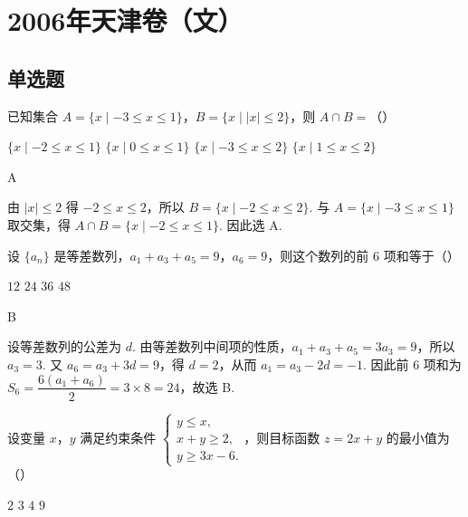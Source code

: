 \chapter{2006年天津卷（文）}
\section{单选题}
\begin{problem}
已知集合 \(A = \{x \mid -3 \leqslant x \leqslant 1\}\)，\(B = \{x \mid |x| \leqslant 2\}\)，则 \(A \cap B =\)（\quad）

\choices
    {\(\{x\mid -2\leqslant x\leqslant 1\}\)}
    {\(\{x\mid 0\leqslant x\leqslant 1\}\)}
    {\(\{x\mid -3\leqslant x\leqslant 2\}\)}
    {\(\{x\mid 1\leqslant x\leqslant 2\}\)}
\end{problem}

\begin{answer}
A
\end{answer}

\begin{solution}
由 \(\lvert x\rvert\leqslant2\) 得 \(-2\leqslant x\leqslant2\)，所以 \(B=\{x\mid -2\leqslant x\leqslant2\}\). 与 \(A=\{x\mid -3\leqslant x\leqslant1\}\) 取交集，得 \(A\cap B=\{x\mid -2\leqslant x\leqslant1\}\). 因此选 A.
\end{solution}

\begin{problem}
设 \(\{a_n\}\) 是等差数列，\(a_1 + a_3 + a_5 = 9\)，\(a_6 = 9\)，则这个数列的前 \(6\) 项和等于（\quad）

\choices
    {\(12\)}
    {\(24\)}
    {\(36\)}
    {\(48\)}
\end{problem}

\begin{answer}
B
\end{answer}

\begin{solution}
设等差数列的公差为 \(d\). 由等差数列中间项的性质，\(a_1+a_3+a_5=3a_3=9\)，所以 \(a_3=3\). 又 \(a_6=a_3+3d=9\)，得 \(d=2\)，从而 \(a_1=a_3-2d=-1\). 因此前 \(6\) 项和为 \(S_6=\dfrac{6(a_1+a_6)}{2}=3\times8=24\)，故选 B.
\end{solution}

\begin{problem}
设变量 \(x\)，\(y\) 满足约束条件 \(\begin{cases}
y \leqslant x,\\
x + y \geqslant 2,\\
y \geqslant 3x - 6.
\end{cases}\)，则目标函数 \(z = 2x + y\) 的最小值为（\quad）

\choices
    {\(2\)}
    {\(3\)}
    {\(4\)}
    {\(9\)}
\end{problem}

